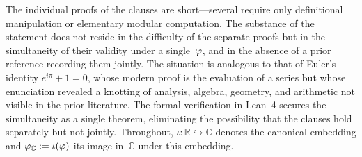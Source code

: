 The individual proofs of the clauses are short---several require only
definitional manipulation or elementary modular computation.  The
substance of the statement does not reside in the difficulty of the
separate proofs but in the simultaneity of their validity under a
single~$\varphi$, and in the absence of a prior reference recording
them jointly.  The situation is analogous to that of Euler's identity
$e^{i\pi}+1=0$, whose modern proof is the evaluation of a series but
whose enunciation revealed a knotting of analysis, algebra, geometry,
and arithmetic not visible in the prior literature.  The formal
verification in Lean~4 secures the simultaneity as a single theorem,
eliminating the possibility that the clauses hold separately but not
jointly.  Throughout, $\iota:\mathbb{R}\hookrightarrow\mathbb{C}$
denotes the canonical embedding and $\varphi_\mathbb{C}:=\iota(\varphi)$
its image in~$\mathbb{C}$ under this embedding.

